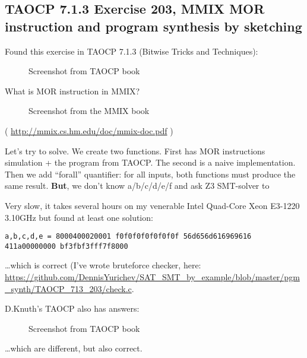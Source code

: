 \subsection{TAOCP 7.1.3 Exercise 203, MMIX MOR instruction and program synthesis by sketching}

\renewcommand{\CURPATH}{synth/pgm/TAOCP_713_203}

Found this exercise in TAOCP 7.1.3 (Bitwise Tricks and Techniques):

\begin{figure}[H]
\centering
{}
\caption{Screenshot from TAOCP book}
\end{figure}

What is MOR instruction in MMIX?

\begin{figure}[H]
\centering
{}
\caption{Screenshot from the MMIX book}
\end{figure}

( \url{http://mmix.cs.hm.edu/doc/mmix-doc.pdf} )

Let's try to solve. We create two functions. First has MOR instructions simulation + the program from TAOCP.
The second is a naive implementation.
Then we add ``forall'' quantifier: for all inputs, both functions must produce the same result.
\textbf{But}, we don't know a/b/c/d/e/f and ask Z3 SMT-solver to



Very slow, it takes several hours on my venerable Intel Quad-Core Xeon E3-1220 3.10GHz but found at least one solution:

\begin{lstlisting}
a,b,c,d,e = 8000400020001 f0f0f0f0f0f0f0f 56d656d616969616 411a00000000 bf3fbf3fff7f8000
\end{lstlisting}

\dots which is correct (I've wrote bruteforce checker, here: \url{https://github.com/DennisYurichev/SAT_SMT_by_example/blob/master/pgm_synth/TAOCP_713_203/check.c}.

D.Knuth's TAOCP also has answers:

\begin{figure}[H]
\centering
{}
\caption{Screenshot from TAOCP book}
\end{figure}

\dots which are different, but also correct.

